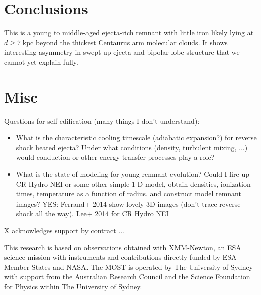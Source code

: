 \documentclass[twocolumn,tighten,trackchanges]{aastex61}
\newcommand*{\mt}{\mathrm}
\newcommand*{\unit}[1]{\;\mt{#1}}  %
\begin{document}

%
%

\section{Conclusions}

This is a young to middle-aged ejecta-rich remnant with little iron likely
lying at $d \geq 7 \unit{kpc}$ beyond the thickest Centaurus arm molecular
clouds.
It shows interesting asymmetry in swept-up ejecta and bipolar lobe structure
that we cannot yet explain fully.

\section{Misc}

Questions for self-edification (many things I don't understand):
\begin{itemize}
    \item What is the characteristic cooling timescale (adiabatic expansion?)
        for reverse shock heated ejecta?
        Under what conditions (density, turbulent mixing, ...)
        would conduction or other energy transfer processes play a role?
    \item What is the state of modeling for young remnant evolution?
        Could I fire up CR-Hydro-NEI or some other simple 1-D model,
        obtain densities, ionization times, temperature as a function of
        radius, and construct model remnant images?
        YES: Ferrand+ 2014 show lovely 3D images (don't trace reverse shock all
        the way).
        Lee+ 2014 for CR Hydro NEI
\end{itemize}

\acknowledgments

X acknowledges support by contract ...

This research is based on observations obtained with XMM-Newton, an ESA science
mission with instruments and contributions directly funded by ESA Member States
and NASA.
The MOST is operated by The University of Sydney with support from the
Australian Research Council and the Science Foundation for Physics within The
University of Sydney.
\end{document}
